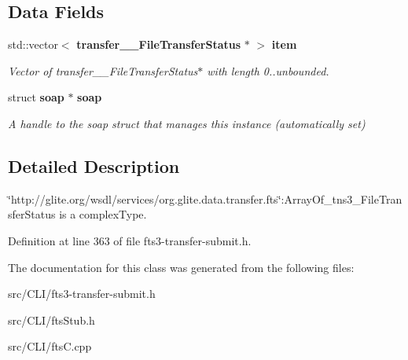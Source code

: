 \subsection*{Data Fields}
\begin{DoxyCompactItemize}
\item 
std::vector$<$ {\bf transfer\_\-\_\-FileTransferStatus} $\ast$ $>$ {\bf item}\label{classfts____ArrayOf__USCOREtns3__USCOREFileTransferStatus_ad799954b132147e706a00c2ccdcf3b88}

\begin{DoxyCompactList}\small\item\em Vector of transfer\_\-\_\-FileTransferStatus$\ast$ with length 0..unbounded. \item\end{DoxyCompactList}\item 
struct {\bf soap} $\ast$ {\bf soap}\label{classfts____ArrayOf__USCOREtns3__USCOREFileTransferStatus_a183460b6173e7a68349cdd8c6733d22f}

\begin{DoxyCompactList}\small\item\em A handle to the soap struct that manages this instance (automatically set) \item\end{DoxyCompactList}\end{DoxyCompactItemize}


\subsection{Detailed Description}
\char`\"{}http://glite.org/wsdl/services/org.glite.data.transfer.fts\char`\"{}:ArrayOf\_\-tns3\_\-FileTransferStatus is a complexType. 

Definition at line 363 of file fts3-\/transfer-\/submit.h.



The documentation for this class was generated from the following files:\begin{DoxyCompactItemize}
\item 
src/CLI/fts3-\/transfer-\/submit.h\item 
src/CLI/ftsStub.h\item 
src/CLI/ftsC.cpp\end{DoxyCompactItemize}
